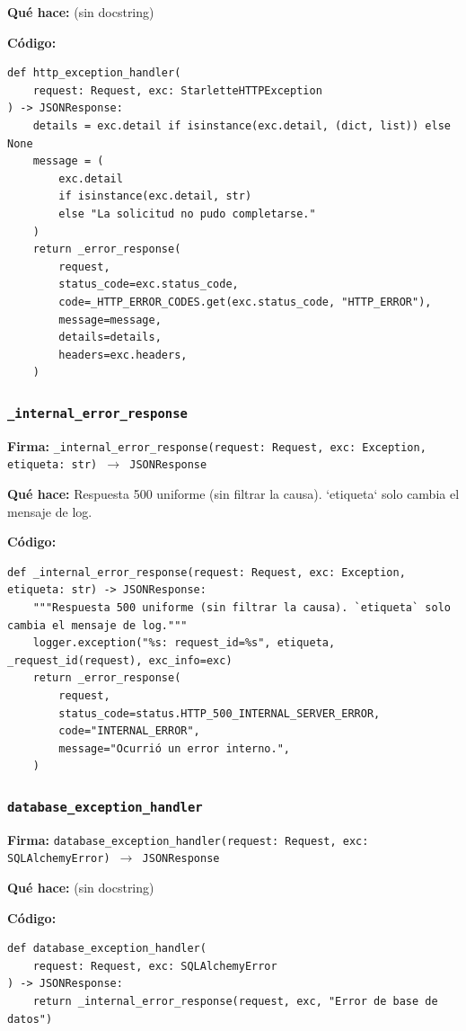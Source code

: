 \documentclass[11pt,a4paper]{article}
\begin{document}
\textbf{Qué hace:} (sin docstring)

\textbf{Código:}
\begin{lstlisting}
def http_exception_handler(
    request: Request, exc: StarletteHTTPException
) -> JSONResponse:
    details = exc.detail if isinstance(exc.detail, (dict, list)) else None
    message = (
        exc.detail
        if isinstance(exc.detail, str)
        else "La solicitud no pudo completarse."
    )
    return _error_response(
        request,
        status_code=exc.status_code,
        code=_HTTP_ERROR_CODES.get(exc.status_code, "HTTP_ERROR"),
        message=message,
        details=details,
        headers=exc.headers,
    )
\end{lstlisting}

\subsubsection*{\texttt{\_internal\_error\_response}}
\textbf{Firma:} \texttt{\_internal\_error\_response(request: Request, exc: Exception, etiqueta: str) $\rightarrow$ JSONResponse}

\textbf{Qué hace:} Respuesta 500 uniforme (sin filtrar la causa). `etiqueta` solo cambia el mensaje de log.

\textbf{Código:}
\begin{lstlisting}
def _internal_error_response(request: Request, exc: Exception, etiqueta: str) -> JSONResponse:
    """Respuesta 500 uniforme (sin filtrar la causa). `etiqueta` solo cambia el mensaje de log."""
    logger.exception("%s: request_id=%s", etiqueta, _request_id(request), exc_info=exc)
    return _error_response(
        request,
        status_code=status.HTTP_500_INTERNAL_SERVER_ERROR,
        code="INTERNAL_ERROR",
        message="Ocurrió un error interno.",
    )
\end{lstlisting}

\subsubsection*{\texttt{database\_exception\_handler}}
\textbf{Firma:} \texttt{database\_exception\_handler(request: Request, exc: SQLAlchemyError) $\rightarrow$ JSONResponse}

\textbf{Qué hace:} (sin docstring)

\textbf{Código:}
\begin{lstlisting}
def database_exception_handler(
    request: Request, exc: SQLAlchemyError
) -> JSONResponse:
    return _internal_error_response(request, exc, "Error de base de datos")
\end{lstlisting}
\end{document}
